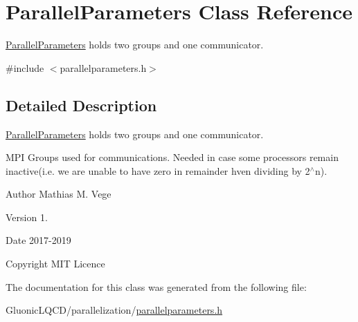 \hypertarget{class_parallel_parameters}{}\section{Parallel\+Parameters Class Reference}
\label{class_parallel_parameters}


\mbox{\hyperlink{class_parallel_parameters}{Parallel\+Parameters}} holds two groups and one communicator.  




{\ttfamily \#include $<$parallelparameters.\+h$>$}



\subsection{Detailed Description}
\mbox{\hyperlink{class_parallel_parameters}{Parallel\+Parameters}} holds two groups and one communicator. 

M\+PI Groups used for communications. Needed in case some processors remain inactive(i.\+e. we are unable to have zero in remainder hven dividing by 2$^\wedge$n).

\begin{DoxyAuthor}{Author}
Mathias M. Vege 
\end{DoxyAuthor}
\begin{DoxyVersion}{Version}
1. 
\end{DoxyVersion}
\begin{DoxyDate}{Date}
2017-\/2019 
\end{DoxyDate}
\begin{DoxyCopyright}{Copyright}
M\+IT Licence 
\end{DoxyCopyright}


The documentation for this class was generated from the following file\+:\begin{DoxyCompactItemize}
\item 
Gluonic\+L\+Q\+C\+D/parallelization/\mbox{\hyperlink{parallelparameters_8h}{parallelparameters.\+h}}\end{DoxyCompactItemize}
